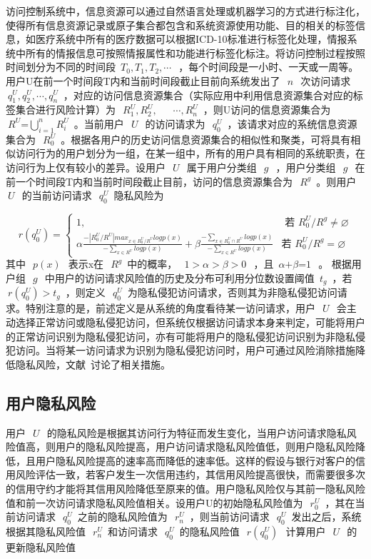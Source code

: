 访问控制系统中，信息资源可以通过自然语言处理或机器学习的方式进行标注化，使得所有信息资源记录或原子集合都包含和系统资源使用功能、目的相关的标签信息，如医疗系统中所有的医疗数据可以根据ICD-10标准进行标签化处理，情报系统中所有的情报信息可按照情报属性和功能进行标签化标注。将访问控制过程按照时间划分为不同的时间段~${{T}_{0}},{{T}_{1}},{{T}_{2}},\cdots ~$~，每个时间段是一小时、一天或一周等。用户U在前一个时间段T内和当前时间段截止目前向系统发出了~$~n~$~次访问请求~$~q_{1}^{U},q_{2}^{U},\cdots ,q_{n}^{U}$~，对应的访问信息资源集合（实际应用中利用信息资源集合对应的标签集合进行风险计算）为~$~R_{1}^{U},R_{2}^{U},~$~ ~$\cdots ,R_{n}^{U}$~，则U访问的信息资源集合为~$~R_{{}}^{U}\text{=}\bigcup\nolimits_{i=1}^{n}{R_{i}^{U}}$~。当前用户~$~U~$~的访问请求为~$~q_{0}^{U}$~，该请求对应的系统信息资源集合为~$~R_{0}^{U}$~。根据各用户的历史访问信息资源集合的相似性和聚类，可将具有相似访问行为的用户划分为一组，在某一组中，所有的用户具有相同的系统职责，在访问行为上仅有较小的差异。设用户~$~U~$~属于用户分类组~$~g~$~，用户分类组~$~g~$~在前一个时间段T内和当前时间段截止目前，访问的信息资源集合为~$~R_{{}}^{g}$~。则用户~$~U~$~的当前访问请求~$~q_{0}^{U}$~隐私风险为

\begin{equation}
r(q_{0}^{U})=\begin{cases}
1, & \text{ 若 } R_{0}^{U}/{{R}^{g}}\ne \varnothing \\ 
\alpha \frac{-|R_{0}^{U}/{R}^{U}|max_{x\in R_{0}^{U}/{R}^{U}}logp(x)}{-\sum_{x\in{R^U}}logp(x)}+ \beta \frac{-\sum_{x\in R_0^U \cap  R^U}logp(x)}{-\sum_{x\in  R^U}logp(x)}& \text{若 } R_{0}^{U}/{{R}^{g}}=\varnothing 
\end{cases}
\end{equation}
其中~$~p(x)~$~表示x在~$~R_{{}}^{g}$~中的概率，~$~1>\alpha >\beta >0~$~，且~$\alpha \text{+}\beta \text{=}1~$~。
根据用户组~$~g~$~中用户的访问请求风险值的历史及分布可利用分位数设置阈值~${{t}_{g}}$~，若~$~r(q_{0}^{U})>{{t}_{g}}$~，则定义~$~q_{0}^{U}$~为隐私侵犯访问请求，否则其为非隐私侵犯访问请求。特别注意的是，前述定义是从系统的角度看待某一访问请求，用户~$~U~$~会主动选择正常访问或隐私侵犯访问，但系统仅根据访问请求本身来判定，可能将用户的正常访问识别为隐私侵犯访问，亦有可能将用户的隐私侵犯访问识别为非隐私侵犯访问。当将某一访问请求为识别为隐私侵犯访问时，用户可通过风险消除措施降低隐私风险，文献~\cite{diaz-lopez2016dynamic}讨论了相关措施。

\subsection{用户隐私风险}
用户~$~U~$~的隐私风险是根据其访问行为特征而发生变化，当用户访问请求隐私风险值高，则用户的隐私风险提高，用户访问请求隐私风险值低，则用户隐私风险降低，且用户隐私风险提高的速率高而降低的速率低。这样的假设与银行对客户的信用风险评估一致，若客户发生一次信用违约，其信用风险提高很快，而需要很多次的信用守约才能将其信用风险降低至原来的值。用户隐私风险仅与其前一隐私风险值和前一次访问请求隐私风险值相关。设用户U的初始隐私风险值为~$~r_{0}^{U}$~，其在当前访问请求~$~q_{0}^{U}$~之前的隐私风险值为~$~r_{n}^{U}$~，则当前访问请求~$~q_{0}^{U}$~发出之后，系统根据其隐私风险值~$~r_{n}^{U}$~和访问请求~$~q_{0}^{U}$~的隐私风险值~$~r(q_{0}^{U})~$~计算用户~$~U~$~的更新隐私风险值

